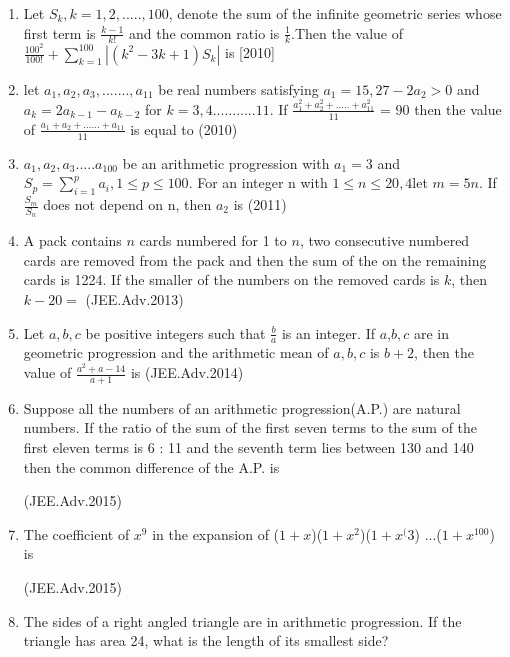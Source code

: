 \documentclass[journal,12pt,twocolumn]{IEEEtran}
\theoremstyle{remark}
\begin{document}
\begin{enumerate}
    

\item Let $S_{k}, k = 1,2, ..... , 100$, denote the sum of the infinite geometric series whose first term is  $\frac{k - 1}{k!}$ and the common ratio is $\frac{1}{k}$.Then the value of $\frac{100^{2}}{100!} + \sum_{k=1}^{100} |(k^{2} - 3k +1)S_{k} |$ is \hfill[2010]

\item let $a_{1},a_{2},a_{3},......., a_{11}$ be real numbers satisfying $a_{1}= 15, 27 - 2a_{2} > 0$ and $a_{k}=2a_{k-1} - a_{k-2}$ for $k=3,4...........11$. If $\frac{a_{1}^{2} + a_{2}^{2} + ..... +a_{11}^{2}}{11}$ = 90 then the value of $\frac{a_{1} + a_{2} +...... +a_{11}}{11}$ is equal to \hfill(2010)

\item $a_{1}, a_{2}, a_{3}.....a_{100}$ be an arithmetic progression with $a_{1}= 3$ and $S_{p} =\sum_{i=1}^{p} a_{i},1\leq p\leq 100$. For an integer n with $1 \leq n \leq 20,4$let $m= 5n$. If $\frac{S_{m}}{S_{n}}$ does not depend on n, then $a_{2}$ is \hfill(2011)

   \item A pack contains $n$ cards numbered for 1 to $n$, two consecutive numbered cards are removed from the pack and then the sum of the on the remaining cards is 1224. If the smaller of the numbers on the removed cards is $k$, then $k - 20=$ \hfill(JEE.Adv.2013)

   \item Let $a,b,c$ be positive integers such that $\frac{b}{a}$ is an integer. If $a$,$b,c$ are in geometric progression and the arithmetic mean of $a,b,c$ is $b + 2$, then the value of $\frac{a^{2} + a - 14}{a + 1}$ is \hfill(JEE.Adv.2014)

   \item Suppose all the numbers of an arithmetic progression(A.P.) are natural numbers. If the ratio of the sum of the first seven terms to the sum of the first eleven terms is 6 : 11 and the seventh term lies between 130 and 140 then the common difference of the A.P. is 
   
   \hspace{1cm} \hfill(JEE.Adv.2015)

   \item The coefficient of $x^{9}$ in the expansion of ($1+x$)($1+x^{2}$)($1+x^({3}$) ...($1+x^{100}$) is 
   
   \hfill(JEE.Adv.2015)

   \item The sides of a right angled triangle are in arithmetic progression. If the triangle has area 24, what is the length of its smallest side? 
   

\end{enumerate}
\end{document}
